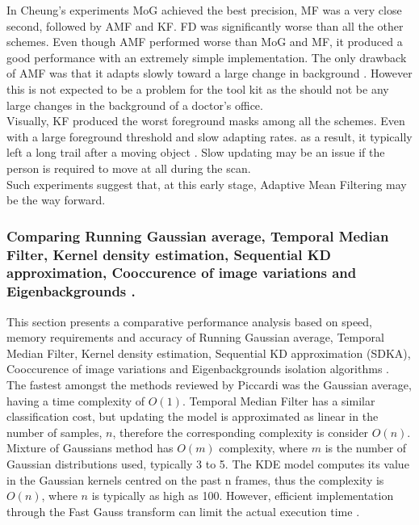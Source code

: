 In Cheung's experiments \cite{Cheung2007} MoG achieved the best precision, MF was a very close second, followed by AMF and KF. FD was significantly worse than all the other schemes. Even though AMF performed worse than MoG and MF, it produced a good performance with an extremely simple implementation. The only drawback of AMF was that it adapts slowly toward a large change in background \cite{Cheung2007}. However this is not expected to be a problem for the tool kit as the should not be any large changes in the background of a doctor's office.\\

Visually, KF produced the worst foreground masks among all the schemes. Even with a large foreground threshold and slow adapting rates. as a result, it typically left a long trail after a moving object \cite{Cheung2007}. Slow updating may be an issue if the  person is required to move at all during the scan.\\

Such experiments suggest that, at this early stage, Adaptive Mean Filtering may be the way forward.\\

\subsubsection{Comparing Running Gaussian average, Temporal Median Filter, Kernel density estimation, Sequential KD approximation, Cooccurence of image variations and Eigenbackgrounds \cite{Piccardi2004}.}

This section presents a comparative performance analysis based on
speed, memory requirements and accuracy of Running Gaussian average, Temporal Median Filter, Kernel density estimation, Sequential KD approximation (SDKA), Cooccurence of image variations and Eigenbackgrounds isolation algorithms \cite{Piccardi2004}.\\

The fastest amongst the methods reviewed by Piccardi \cite{Piccardi2004} was the Gaussian average, having a time complexity of $O(1)$.
Temporal Median Filter has a similar classification cost, but updating the  model is approximated as linear in the number of samples, $n$, therefore the corresponding complexity is consider $O(n)$. 
Mixture of Gaussians method has $O(m)$ complexity, where $m$ is the number of Gaussian distributions used, typically 3 to 5. 
The KDE model computes its value in the Gaussian kernels centred on the past 
n frames, thus the complexity is $O(n)$, where $n$ is typically as high as 100. 
However, efficient implementation through the Fast Gauss transform can
limit the actual execution time \cite{Elgammal2003}.





